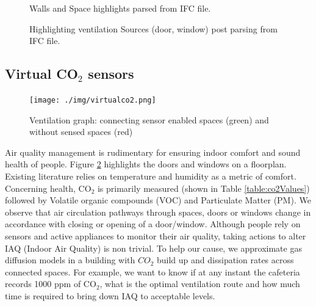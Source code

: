  



\begin{figure}
     \centering
      \caption{ Walls and Space highlights parsed from IFC file. }%
    \label{fig:wallSpaceHighlights}%
\end{figure}
\begin{figure}
     \centering
      \caption{ Highlighting ventilation Sources (door, window) post parsing from IFC file. }%
    \label{fig:ventilationHighlights}%
\end{figure}

\subsection{Virtual CO$_2$ sensors}

\begin{figure}
     \centering
     {\texttt{[image: ./img/virtualco2.png]} }
      \caption{Ventilation graph: connecting sensor enabled spaces (green) and without sensed spaces (red)}%
    \label{fig:virtualco2}%
\end{figure}

Air quality management is rudimentary for ensuring indoor comfort and sound health of people. Figure \ref{fig:ventilationHighlights} highlights the doors and windows on a floorplan. Existing literature relies on temperature and humidity as a metric of comfort. Concerning health, CO$_2$ is primarily measured (shown in Table \ref{table:co2Values}) followed by Volatile organic compounds (VOC) and Particulate Matter (PM). We observe that air circulation pathways through spaces, doors or windows change in accordance with closing or opening of a door/window. Although people rely on sensors and active appliances to monitor their air quality, taking actions to alter IAQ (Indoor Air Quality) is non trivial. To help our cause, we approximate gas diffusion models in a building with $CO_2$ build up and dissipation rates across connected spaces. For example, we want to know if at any instant the cafeteria records 1000 ppm of CO$_2$, what is the optimal ventilation route and how much time is required to bring down IAQ to acceptable levels.


